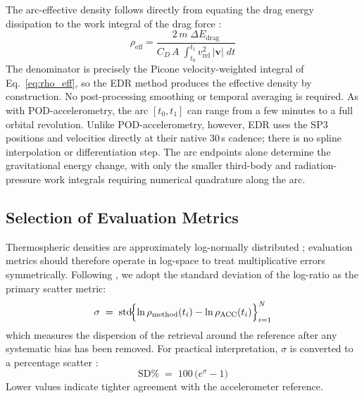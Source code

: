 \documentclass{agujournal2019}
\begin{document}
The arc-effective density follows directly from equating the drag energy
dissipation to the work integral of the drag force
\cite{Sutton2021TowardSatellites}:
\begin{equation}
\rho_{\text{eff}} = \frac{2\,m\;\Delta E_{\text{drag}}}
                         {C_D\, A \;\displaystyle\int_{t_0}^{t_1}
                          v_{\text{rel}}^2\,|\mathbf{v}|\;dt}
\end{equation}
The denominator is precisely the Picone velocity-weighted integral of
Eq.~\eqref{eq:rho_eff}, so the EDR method produces the effective density by
construction. No post-processing smoothing or temporal averaging is required.
As with POD-accelerometry, the arc $[t_0, t_1]$ can range from a few minutes
to a full orbital revolution. Unlike POD-accelerometry, however, EDR uses the
SP3 positions and velocities directly at their native 30\,s cadence; there
is no spline interpolation or differentiation step. The arc endpoints alone
determine the gravitational energy change, with only the smaller third-body
and radiation-pressure work integrals requiring numerical quadrature along
the arc.

\subsection{Selection of Evaluation Metrics}
\label{sec:metrics}

Thermospheric densities are approximately log-normally distributed
\cite{Emmert2015ThermosphericReview, Picone2005ThermosphericSets}; evaluation
metrics should therefore operate in log-space to treat multiplicative errors
symmetrically. Following , we adopt
the standard deviation of the log-ratio as the primary scatter metric:
\begin{equation}
\sigma \;=\; \operatorname{std}\!\Bigl\{
  \ln\rho_{\text{method}}(t_i) - \ln\rho_{\text{ACC}}(t_i)
\Bigr\}_{i=1}^{N}
\end{equation}
which measures the dispersion of the retrieval around the reference after any
systematic bias has been removed. For practical interpretation, $\sigma$ is
converted to a percentage scatter
\cite{Fitzpatrick2024ApplyingSatellite}:
\begin{equation}
\text{SD\%} \;=\; 100\,\bigl(e^{\sigma} - 1\bigr)
\end{equation}
Lower values indicate tighter agreement with
the accelerometer reference.
\end{document}
